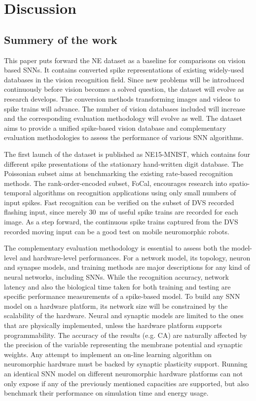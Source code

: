 \documentclass{frontiersENG} %
\begin{document}
\section{Discussion}
\label{sec:summ}
\subsection{Summery of the work}
This paper puts forward the NE dataset as a baseline for comparisons on vision based SNNs.
It contains converted spike representations of existing widely-used databases in the vision recognition field.
Since new problems will be introduced continuously before vision becomes a solved question, the dataset will evolve as research develops. 
The conversion methods transforming images and videos to spike trains will advance. The number of vision databases included will increase and the corresponding evaluation methodology will evolve as well.
The dataset aims to provide a unified spike-based vision database and complementary evaluation methodologies to assess the performance of various SNN algorithms.

The first launch of the dataset is published as NE15-MNIST, which contains four different spike presentations of the stationary hand-written digit database.
The Poissonian subset aims at benchmarking the existing rate-based recognition methods.
The rank-order-encoded subset, FoCal, encourages research into spatio-temporal algorithms on recognition applications using only small numbers of input spikes.
Fast recognition can be verified on the subset of DVS recorded flashing input, since merely 30~ms of useful spike trains are recorded for each image.
As a step forward, the continuous spike trains captured from the DVS recorded moving input can be a good test on mobile neuromorphic robots.

The complementary evaluation methodology is essential to assess both the model-level and hardware-level performances.
For a network model, its topology, neuron and synapse models, and training methods are major descriptions for any kind of neural networks, including SNNs.
While the recognition accuracy, network latency and also the biological time taken for both training and testing are specific performance measurements of a spike-based model.
To build any SNN model on a hardware platform, its network size will be constrained by the scalability of the hardware. Neural and synaptic models are limited to the ones that are physically implemented, unless the hardware platform supports programmability.
The accuracy of the results (e.g. CA) are naturally affected by the precision of the variable representing the membrane potential and synaptic weights.
Any attempt to implement an on-line learning algorithm on neuromorphic hardware must be backed by synaptic plasticity support.
Running an identical SNN model on different neuromorphic hardware platforms can not only expose if any of the previously mentioned capacities are supported, but also benchmark their performance on simulation time and energy usage.
\end{document}
